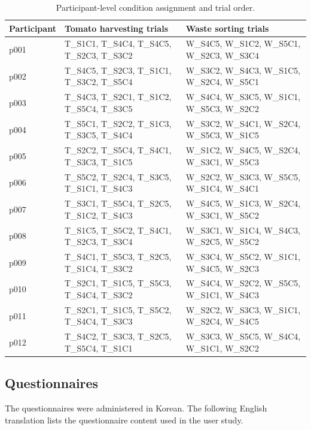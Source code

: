 \begin{table}[t]
\centering
\caption{Participant-level condition assignment and trial order.}
\label{tab:app_participant_condition_order}
\scriptsize
\setlength{\tabcolsep}{3pt}
\begin{tabular*}{\textwidth}{@{\extracolsep{\fill}}lll}
\toprule
\textbf{Participant} & \textbf{Tomato harvesting trials} & \textbf{Waste sorting trials} \\
\midrule
p001 & T\_S1C1, T\_S4C4, T\_S4C5, T\_S2C3, T\_S3C2 & W\_S4C5, W\_S1C2, W\_S5C1, W\_S2C3, W\_S3C4 \\
p002 & T\_S4C5, T\_S2C3, T\_S1C1, T\_S3C2, T\_S5C4 & W\_S3C2, W\_S4C3, W\_S1C5, W\_S2C4, W\_S5C1 \\
p003 & T\_S4C3, T\_S2C1, T\_S1C2, T\_S5C4, T\_S3C5 & W\_S4C4, W\_S3C5, W\_S1C1, W\_S5C3, W\_S2C2 \\
p004 & T\_S5C1, T\_S2C2, T\_S1C3, T\_S3C5, T\_S4C4 & W\_S3C2, W\_S4C1, W\_S2C4, W\_S5C3, W\_S1C5 \\
p005 & T\_S2C2, T\_S5C4, T\_S4C1, T\_S3C3, T\_S1C5 & W\_S1C2, W\_S4C5, W\_S2C4, W\_S3C1, W\_S5C3 \\
p006 & T\_S5C2, T\_S2C4, T\_S3C5, T\_S1C1, T\_S4C3 & W\_S2C2, W\_S3C3, W\_S5C5, W\_S1C4, W\_S4C1 \\
p007 & T\_S3C1, T\_S5C4, T\_S2C5, T\_S1C2, T\_S4C3 & W\_S4C5, W\_S1C3, W\_S2C4, W\_S3C1, W\_S5C2 \\
p008 & T\_S1C5, T\_S5C2, T\_S4C1, T\_S2C3, T\_S3C4 & W\_S3C1, W\_S1C4, W\_S4C3, W\_S2C5, W\_S5C2 \\
p009 & T\_S4C1, T\_S5C3, T\_S2C5, T\_S1C4, T\_S3C2 & W\_S3C4, W\_S5C2, W\_S1C1, W\_S4C5, W\_S2C3 \\
p010 & T\_S2C1, T\_S1C5, T\_S5C3, T\_S4C4, T\_S3C2 & W\_S4C4, W\_S2C2, W\_S5C5, W\_S1C1, W\_S4C3 \\
p011 & T\_S2C1, T\_S1C5, T\_S5C2, T\_S4C4, T\_S3C3 & W\_S2C2, W\_S3C3, W\_S1C1, W\_S2C4, W\_S4C5 \\
p012 & T\_S4C2, T\_S3C3, T\_S2C5, T\_S5C4, T\_S1C1 & W\_S3C3, W\_S5C5, W\_S4C4, W\_S1C1, W\_S2C2 \\
\bottomrule
\end{tabular*}
\end{table}

\subsection{Questionnaires}

The questionnaires were administered in Korean. The following English translation lists the questionnaire content used in the user study.

